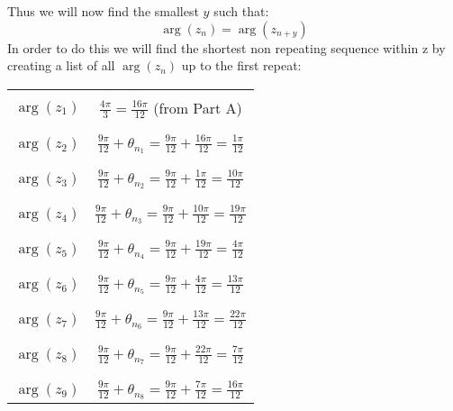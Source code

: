 \documentclass[11pt]{article}
\begin{document}
Thus we will now find the smallest $y$ such that:
\[ \arg(z_n) = \arg(z_{n+y}) \]
In order to do this we will find the shortest non repeating sequence within z by creating a list of all $\arg(z_n)$ up to the first repeat:
\begin{center}
 \begin{tabular}{||c | c ||} 
\hline\\[-1em]
 $\arg(z_1)$ &  $\frac{4\pi}{3} = \frac{16\pi}{12}$ (from Part A) \\ \\[-1em]
 \hline \\[-1em]
 $\arg(z_2)$ &  $\frac{9\pi}{12} +\theta_{n_1} = \frac{9\pi}{12} + \frac{16\pi}{12} = \frac{1\pi}{12}$\\ \\[-1em]
 \hline \\[-1em]
 $\arg(z_3)$ & $\frac{9\pi}{12} +\theta_{n_2} = \frac{9\pi}{12} + \frac{1\pi}{12} = \frac{10\pi}{12}$\\ \\[-1em]
 \hline \\[-1em]
 $\arg(z_4)$ & $\frac{9\pi}{12} +\theta_{n_3} = \frac{9\pi}{12} + \frac{10\pi}{12} = \frac{19\pi}{12}$\\ \\[-1em]
 \hline \\[-1em]
 $\arg(z_5)$ & $\frac{9\pi}{12} +\theta_{n_4} = \frac{9\pi}{12} + \frac{19\pi}{12} = \frac{4\pi}{12}$\\ \\[-1em]
 \hline \\[-1em]
 $\arg(z_6)$ & $\frac{9\pi}{12} +\theta_{n_5} = \frac{9\pi}{12} + \frac{4\pi}{12} = \frac{13\pi}{12}$\\ \\[-1em]
 \hline \\[-1em]
$\arg(z_7)$ & $\frac{9\pi}{12} +\theta_{n_6} = \frac{9\pi}{12} + \frac{13\pi}{12} = \frac{22\pi}{12}$\\  \\[-1em]
 \hline  \\[-1em]
$\arg(z_8)$ & $\frac{9\pi}{12} +\theta_{n_7} = \frac{9\pi}{12} + \frac{22\pi}{12} = \frac{7\pi}{12}$\\  \\[-1em]
 \hline  \\[-1em]
$\arg(z_9)$ & $\frac{9\pi}{12} +\theta_{n_8} = \frac{9\pi}{12} + \frac{7\pi}{12} = \frac{16\pi}{12}$\\  
 \hline
\end{tabular}
\end{center}
\end{document}
